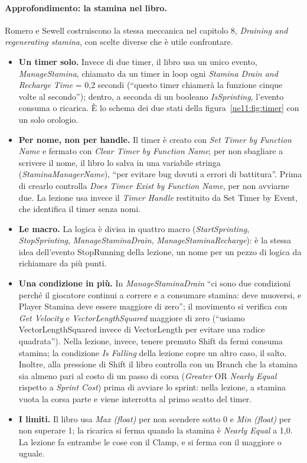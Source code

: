\paragraph{Approfondimento: la stamina nel libro.} Romero e Sewell costruiscono la stessa
meccanica nel capitolo 8, \emph{Draining and regenerating stamina}, con scelte diverse che
è utile confrontare.
\begin{itemize}
  \item \textbf{Un timer solo.} Invece di due timer, il libro usa un unico evento,
        \emph{ManageStamina}, chiamato da un timer in loop ogni \emph{Stamina Drain and
        Recharge Time} = 0,2 secondi (``questo timer chiamerà la funzione cinque volte al
        secondo''); dentro, a seconda di un booleano \emph{IsSprinting}, l'evento consuma
        o ricarica. È lo schema dei due stati della figura~\ref{ue11:fig:timer} con un solo
        orologio.
  \item \textbf{Per nome, non per handle.} Il timer è creato con \emph{Set Timer by Function
        Name} e fermato con \emph{Clear Timer by Function Name}; per non sbagliare a
        scrivere il nome, il libro lo salva in una variabile stringa
        (\emph{StaminaManagerName}), ``per evitare bug dovuti a errori di battitura''. Prima
        di crearlo controlla \emph{Does Timer Exist by Function Name}, per non avviarne
        due. La lezione usa invece il \emph{Timer Handle} restituito da Set Timer by Event,
        che identifica il timer senza nomi.
  \item \textbf{Le macro.} La logica è divisa in quattro macro (\emph{StartSprinting},
        \emph{StopSprinting}, \emph{ManageStaminaDrain}, \emph{ManageStaminaRecharge}): è
        la stessa idea dell'evento StopRunning della lezione, un nome per un pezzo di
        logica da richiamare da più punti.
  \item \textbf{Una condizione in più.} In \emph{ManageStaminaDrain} ``ci sono due
        condizioni perché il giocatore continui a correre e a consumare stamina: deve
        muoversi, e Player Stamina deve essere maggiore di zero''; il movimento si verifica
        con \emph{Get Velocity} e \emph{VectorLengthSquared} maggiore di zero (``usiamo
        VectorLengthSquared invece di VectorLength per evitare una radice quadrata''). Nella
        lezione, invece, tenere premuto Shift da fermi consuma stamina; la condizione
        \emph{Is Falling} della lezione copre un altro caso, il salto. Inoltre, alla
        pressione di Shift il libro controlla con un Branch che la stamina sia almeno pari
        al costo di un passo di corsa (\emph{Greater} OR \emph{Nearly Equal} rispetto a
        \emph{Sprint Cost}) prima di avviare lo sprint: nella lezione, a stamina vuota la
        corsa parte e viene interrotta al primo scatto del timer.
  \item \textbf{I limiti.} Il libro usa \emph{Max (float)} per non scendere sotto 0 e
        \emph{Min (float)} per non superare 1; la ricarica si ferma quando la stamina è
        \emph{Nearly Equal} a 1,0. La lezione fa entrambe le cose con il Clamp, e si
        ferma con il maggiore o uguale.
\end{itemize}
